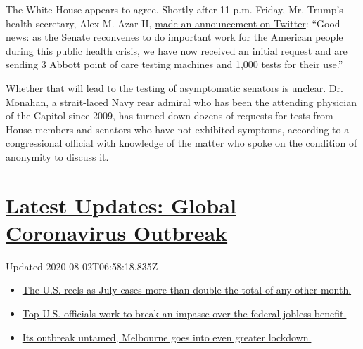 The White House appears to agree. Shortly after 11 p.m. Friday, Mr.
Trump's health secretary, Alex M. Azar II,
\href{https://twitter.com/SecAzar/status/1256420542971875330?s=20}{made
an announcement on Twitter}: ``Good news: as the Senate reconvenes to do
important work for the American people during this public health crisis,
we have now received an initial request and are sending 3 Abbott point
of care testing machines and 1,000 tests for their use.''

Whether that will lead to the testing of asymptomatic senators is
unclear. Dr. Monahan, a
\href{https://www.navy.mil/navydata/bios/navybio.asp?bioID=514}{strait-laced
Navy rear admiral} who has been the attending physician of the Capitol
since 2009, has turned down dozens of requests for tests from House
members and senators who have not exhibited symptoms, according to a
congressional official with knowledge of the matter who spoke on the
condition of anonymity to discuss it.

\hypertarget{latest-updates-global-coronavirus-outbreak}{%
\section{\texorpdfstring{\href{https://www.nytimes.com/2020/08/01/world/coronavirus-covid-19.html?action=click\&pgtype=Article\&state=default\&region=MAIN_CONTENT_1\&context=storylines_live_updates}{Latest
Updates: Global Coronavirus
Outbreak}}{Latest Updates: Global Coronavirus Outbreak}}\label{latest-updates-global-coronavirus-outbreak}}

Updated 2020-08-02T06:58:18.835Z

\begin{itemize}
\tightlist
\item
  \href{https://www.nytimes.com/2020/08/01/world/coronavirus-covid-19.html?action=click\&pgtype=Article\&state=default\&region=MAIN_CONTENT_1\&context=storylines_live_updates\#link-34047410}{The
  U.S. reels as July cases more than double the total of any other
  month.}
\item
  \href{https://www.nytimes.com/2020/08/01/world/coronavirus-covid-19.html?action=click\&pgtype=Article\&state=default\&region=MAIN_CONTENT_1\&context=storylines_live_updates\#link-780ec966}{Top
  U.S. officials work to break an impasse over the federal jobless
  benefit.}
\item
  \href{https://www.nytimes.com/2020/08/01/world/coronavirus-covid-19.html?action=click\&pgtype=Article\&state=default\&region=MAIN_CONTENT_1\&context=storylines_live_updates\#link-2bc8948}{Its
  outbreak untamed, Melbourne goes into even greater lockdown.}
\end{itemize}

